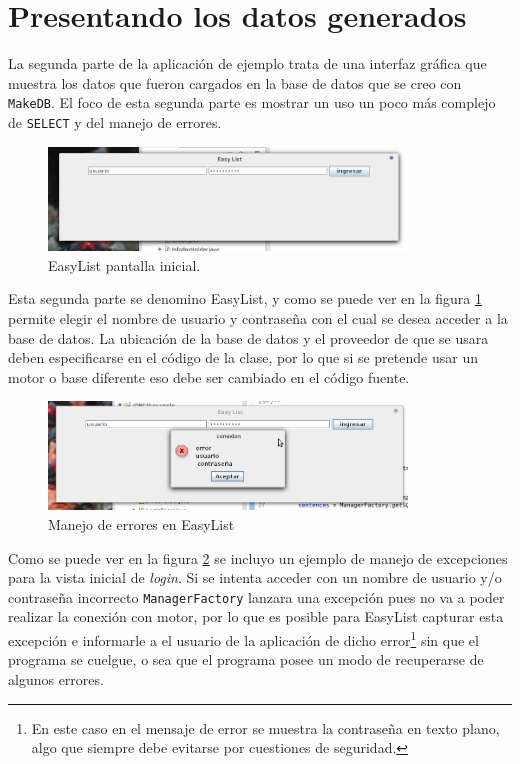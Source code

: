 \section{Presentando los datos generados}
La segunda parte de la aplicación de ejemplo trata de una interfaz gráfica que muestra los datos que fueron cargados en la base de datos que se creo con \verb=MakeDB=. El foco de esta segunda parte es mostrar un uso un poco más complejo de \verb=SELECT= y del manejo de errores.
%

\begin{figure}[h]
  \centering
    \includegraphics[width=0.85\textwidth]{figuras/ejemplo-a.png}
  \caption{EasyList pantalla inicial.}
  \label{fig:easylist-inicio}
\end{figure}

Esta segunda parte se denomino EasyList, y como se puede ver en la figura \ref{fig:easylist-inicio} permite elegir el nombre de usuario y contraseña con el cual se desea acceder a la base de datos. La ubicación de la base de datos y el proveedor de \dd que se usara deben especificarse en el código de la clase, por lo que si se pretende usar un motor o base diferente eso debe ser cambiado en el código fuente.
%

\begin{figure}[h]
  \centering
    \includegraphics[width=0.85\textwidth]{figuras/ejemplo-b.png}
  \caption{Manejo de errores en EasyList}
  \label{fig:easylist-error}
\end{figure}
%

Como se puede ver en la figura \ref{fig:easylist-error} se incluyo un ejemplo de manejo de excepciones para la vista inicial de \textit{login}. Si se intenta acceder con un nombre de usuario y/o contraseña incorrecto \verb=ManagerFactory= lanzara una excepción pues no va a poder realizar la conexión con motor, por lo que es posible para EasyList capturar esta excepción e informarle a el usuario de la aplicación de dicho error\footnote{En este caso en el mensaje de error se muestra la contraseña en texto plano, algo que siempre debe evitarse por cuestiones de seguridad.} sin que el programa se cuelgue, o sea que el programa posee un modo de recuperarse de algunos errores.

